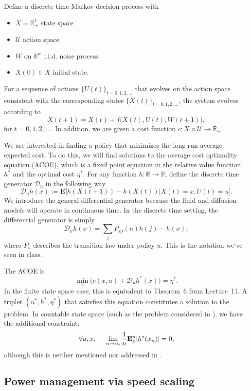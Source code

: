 \documentclass[11pt]{article}
\begin{document}
Define a discrete time Markov decision process with
\begin{itemize}
\item $X = \mathbb{R}_+^\ell$ state space
\item $\mathcal{U}$ action space
\item $W$ on $\mathbb{R}^w$ i.i.d. noise process
\item $X(0) \in X$ initial state.
\end{itemize}
For a sequence of actions $\{U(t)\}_{t=0,1,2,\ldots}$ that evolves on the action space consistent with the corresponding states $\{X(t)\}_{t=0,1,2,\ldots}$, the system evolves according to
$$X(t+1) = X(t) + f\big( X(t), U(t), W(t+1) \big),$$
for $t = 0,1,2,\ldots$.
In addition, we are given a cost function $c:X\times \mathcal{U} \rightarrow \mathbb{R}_+$.

We are interested in finding a policy that minimizes the long-run average expected cost. To do this, we will find solutions to the average cost optimality equation (ACOE), which is a fixed point equation in the relative value function $h^*$ and the optimal cost $\eta^*$. For any function $h:\mathbb{R} \rightarrow \mathbb{R}$, define the discrete time generator $\mathcal{D}_u$ in the following way
$$\mathcal{D}_u h(x) :=  \mathbf{E}\Big[ h(X(t+1)) - h(X(t)) \vert X(t) = x, U(t) = u \Big].$$
We introduce the general differential generator because the fluid and diffusion models will operate in continuous time. In the discrete time setting, the differential generator is simply
$$\mathcal{D}_u h(x) = \sum_j P_{xj}(u) h(j) - h(x),$$
where $P_u$ describes the transition law under policy $u$. This is the notation we've seen in class.

The ACOE is
$$\min_u \Big( c(x,u) + \mathcal{D}_u h^*(x) \Big) = \eta^*.$$
In the finite state space case, this is equivalent to Theorem~6 from Lecture~11. A triplet $(u^*,h^*,\eta^*)$ that satisfies this equation constitutes a solution to the problem. In countable state space (such as the problem considered in \cite{paper}), we have the additional constraint:
$$\forall u, x, \hspace{0.5cm} \lim_{n \rightarrow \infty} \frac{1}{n} \mathbf{E}_x^u | h^*(x_n)| = 0,$$
although this is neither mentioned nor addressed in \cite{paper}.



\subsection{Power management via speed scaling}\label{sec:problem}
\end{document}
